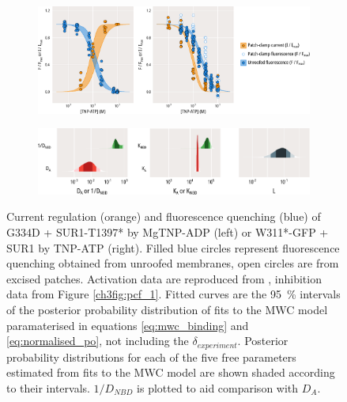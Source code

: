 \begin{figure}[h]
	\centering
	\begin{subfigure}[t]{0.9\textwidth}
		\caption{}\label{ch7fig:activation_fit_1}
		\centering
		\includegraphics[width=\textwidth]{activation_fit_1.pdf}
	\end{subfigure}
	\vfill
	\begin{subfigure}[t]{0.9\textwidth}
		\caption{}\label{ch7fig:activation_params_1}
		\centering
		\includegraphics[width=\textwidth]{activation_params_1.pdf}
	\end{subfigure}
	\caption[TNP-ATP inhibits K\ATP{} more strongly than MgTNP-ADP activates it]{
	 Current regulation (orange) and fluorescence quenching (blue) of G334D + SUR1-T1397* by MgTNP-ADP (left) or W311*-GFP + SUR1 by TNP-ATP (right).
	Filled blue circles represent fluorescence quenching obtained from unroofed membranes, open circles are from excised patches.
	Activation data are reproduced from \citeauthor{puljung_activation_2019-1}, inhibition data from Figure \ref{ch3fig:pcf_1}.
	Fitted curves are the \SI{95}{\percent} intervals of the posterior probability distribution of fits to the MWC model paramaterised in equations \ref{eq:mwc_binding} and \ref{eq:normalised_po}, not including the $\delta_{experiment}$.
	 Posterior probability distributions for each of the five free parameters estimated from fits to the MWC model are shown shaded according to their intervals.
	$1/D_{NBD}$ is plotted to aid comparison with $D_A$.
	}\label{ch7fig:activation_fits}
\end{figure}